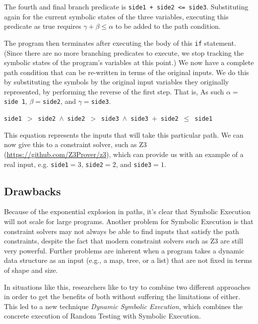 The fourth and final branch predicate is {\tt side1 + side2 <= side3}.
Substituting again for the current symbolic states of the three variables, 
executing this predicate as true requires $\gamma + \beta \leq \alpha$ to be
added to the path condition. 

The program then terminates after executing the body of this {\tt if} statement.
(Since there are no more branching predicates to execute, we stop tracking the
symbolic states of the program's variables at this point.) We now have a
complete path condition that can be re-written in terms of the original inputs.
We do this by substituting the symbols by the original input variables they
originally represented, by performing the reverse of the first step. That is, As
such $\alpha = ${\tt side 1}, $\beta = ${\tt side2}, and $\gamma = ${\tt side3}.

\begin{center}
{\tt side1}~$ > $~{\tt side2}~$ \wedge $~{\tt side2}~$ > $~{\tt side3}~$ \wedge
$~{\tt side3}~$ + $~{\tt side2}~$ \leq $~{\tt side1}
\end{center}

This equation represents the inputs that will take this particular path. We can
now give this to a constraint solver, such as Z3
(\url{https://github.com/Z3Prover/z3}), which can provide us with an example of
a real input, e.g. {\tt side1}$ = 3$, {\tt side2}$ = 2$, and {\tt side3}$ = 1$. 

\subsection{Drawbacks}

Because of the exponential explosion in paths, it's clear that Symbolic
Execution will not scale for large programs. Another problem for Symbolic
Execution is that constraint solvers may not always be able to find inputs that
satisfy the path constraints, despite the fact that modern constraint solvers
such as Z3 are still very powerful. Further problems are inherent when a program
takes a dynamic data structure as an input (e.g., a map, tree, or a list) that
are not fixed in terms of shape and size. 

In situations like this, researchers like to try to combine two different
approaches in order to get the benefits of both without suffering the
limitations of either. This led to a new technique {\it Dynamic Symbolic
Execution}, which combines the concrete execution of Random Testing with
Symbolic Execution.

